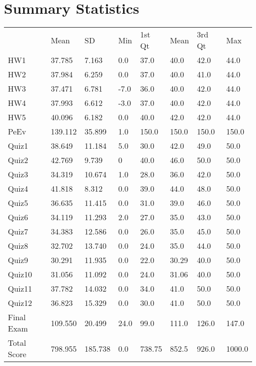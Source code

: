 \documentclass{article}
\begin{document}
\section{Summary Statistics}
\begin{tabular}{llllllll}
            & Mean    & SD      & Min  & 1st Qt & Mean  & 3rd Qt & Max    \\
HW1         & 37.785  & 7.163   & 0.0  & 37.0         & 40.0  & 42.0         & 44.0   \\
HW2         & 37.984  & 6.259   & 0.0  & 37.0         & 40.0  & 41.0         & 44.0   \\
HW3         & 37.471  & 6.781   & -7.0 & 36.0         & 40.0  & 42.0         & 44.0   \\
HW4         & 37.993  & 6.612   & -3.0 & 37.0         & 40.0  & 42.0         & 44.0   \\
HW5         & 40.096  & 6.182   & 0.0  & 40.0         & 42.0  & 42.0         & 44.0   \\
PeEv        & 139.112 & 35.899  & 1.0  & 150.0        & 150.0 & 150.0        & 150.0  \\
Quiz1       & 38.649  & 11.184  & 5.0  & 30.0         & 42.0  & 49.0         & 50.0   \\
Quiz2       & 42.769  & 9.739   & 0    & 40.0         & 46.0  & 50.0         & 50.0   \\
Quiz3       & 34.319  & 10.674  & 1.0  & 28.0         & 36.0  & 42.0         & 50.0   \\
Quiz4       & 41.818  & 8.312   & 0.0  & 39.0         & 44.0  & 48.0         & 50.0   \\
Quiz5       & 36.635  & 11.415  & 0.0  & 31.0         & 39.0  & 46.0         & 50.0   \\
Quiz6       & 34.119  & 11.293  & 2.0  & 27.0         & 35.0  & 43.0         & 50.0   \\
Quiz7       & 34.383  & 12.586  & 0.0  & 26.0         & 35.0  & 45.0         & 50.0   \\
Quiz8       & 32.702  & 13.740  & 0.0  & 24.0         & 35.0  & 44.0         & 50.0   \\
Quiz9       & 30.291  & 11.935  & 0.0  & 22.0         & 30.29 & 40.0         & 50.0   \\
Quiz10      & 31.056  & 11.092  & 0.0  & 24.0         & 31.06 & 40.0         & 50.0   \\
Quiz11      & 37.782  & 14.032  & 0.0  & 34.0         & 41.0  & 50.0         & 50.0   \\
Quiz12      & 36.823  & 15.329  & 0.0  & 30.0         & 41.0  & 50.0         & 50.0   \\
Final Exam  & 109.550 & 20.499  & 24.0 & 99.0         & 111.0 & 126.0        & 147.0  \\
Total Score & 798.955 & 185.738 & 0.0  & 738.75       & 852.5 & 926.0        & 1000.0
\end{tabular}
\end{document}
